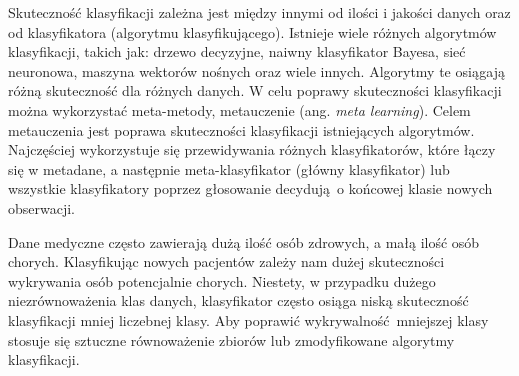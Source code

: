 Skuteczność klasyfikacji zależna jest między innymi od ilości i jakości danych oraz od klasyfikatora (algorytmu klasyfikującego). Istnieje wiele różnych algorytmów klasyfikacji, takich jak: drzewo decyzyjne, naiwny klasyfikator Bayesa, sieć neuronowa, maszyna wektorów nośnych oraz wiele innych. Algorytmy te osiągają różną skuteczność dla różnych danych. W celu poprawy skuteczności klasyfikacji można wykorzystać meta-metody, metauczenie (ang. \textit{meta learning}). Celem metauczenia jest poprawa skuteczności klasyfikacji istniejących algorytmów. Najczęściej wykorzystuje się przewidywania różnych klasyfikatorów, które łączy się w metadane, a następnie meta-klasyfikator (główny klasyfikator) lub wszystkie klasyfikatory poprzez głosowanie decydują o końcowej klasie nowych obserwacji. 	\par 
Dane medyczne często zawierają dużą ilość osób zdrowych, a małą ilość osób chorych. Klasyfikując nowych pacjentów zależy nam dużej skuteczności wykrywania osób potencjalnie chorych. Niestety, w przypadku dużego niezrównoważenia klas danych, klasyfikator często osiąga niską skuteczność klasyfikacji mniej liczebnej klasy. Aby poprawić wykrywalność mniejszej klasy stosuje się sztuczne równoważenie zbiorów lub zmodyfikowane algorytmy klasyfikacji.